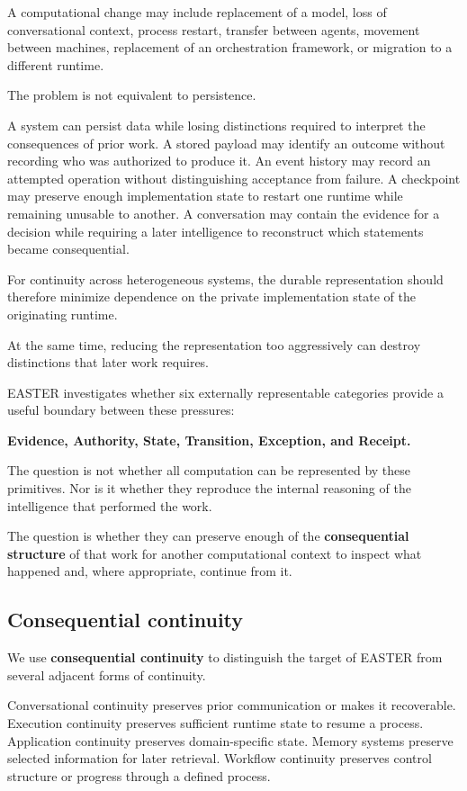 \documentclass[11pt]{article}
\begin{document}
A computational change may include replacement of a model, loss of conversational context, process restart, transfer between agents, movement between machines, replacement of an orchestration framework, or migration to a different runtime.

The problem is not equivalent to persistence.

A system can persist data while losing distinctions required to interpret the consequences of prior work. A stored payload may identify an outcome without recording who was authorized to produce it. An event history may record an attempted operation without distinguishing acceptance from failure. A checkpoint may preserve enough implementation state to restart one runtime while remaining unusable to another. A conversation may contain the evidence for a decision while requiring a later intelligence to reconstruct which statements became consequential.

For continuity across heterogeneous systems, the durable representation should therefore minimize dependence on the private implementation state of the originating runtime.

At the same time, reducing the representation too aggressively can destroy distinctions that later work requires.

EASTER investigates whether six externally representable categories provide a useful boundary between these pressures:

\textbf{Evidence, Authority, State, Transition, Exception, and Receipt.}

The question is not whether all computation can be represented by these primitives. Nor is it whether they reproduce the internal reasoning of the intelligence that performed the work.

The question is whether they can preserve enough of the \textbf{consequential structure} of that work for another computational context to inspect what happened and, where appropriate, continue from it.

\subsection{Consequential continuity}

We use \textbf{consequential continuity} to distinguish the target of EASTER from several adjacent forms of continuity.

Conversational continuity preserves prior communication or makes it recoverable. Execution continuity preserves sufficient runtime state to resume a process. Application continuity preserves domain-specific state. Memory systems preserve selected information for later retrieval. Workflow continuity preserves control structure or progress through a defined process.
\end{document}

